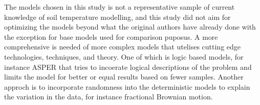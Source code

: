 The models chosen in this study is not a representative sample of current knowledge of soil temperature modelling, and this study did not aim for optimizing the models beyond what the original authors have already done with the exception for base models used for comparison puposus. A more comprehensive is needed of more complex models that utelises cutting edge technologies, techniques, and theory. One of which is logic based models, for instance ASPER\cite{le_asper_2023} that tries to incoerate logical descriptions of the problem and limits the model for better or equal results based on fewer samples\cite{machot_bridging_2023}. Another approch is to incorporate randomness into the deterministic models to explain the variation in the data, for instance fractional Brownian motion\cite{di_crescenzo_model_2022}.
